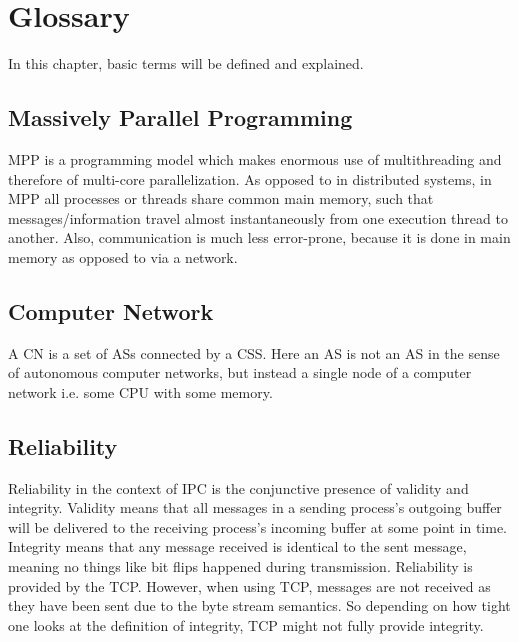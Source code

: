 \chapter{Glossary}

In this chapter, basic terms will be defined and explained.

\section{Massively Parallel Programming}

\acf{MPP} is a programming model which makes enormous use of multithreading and therefore of multi-core parallelization. As opposed to in distributed systems, in \ac{MPP} all processes or threads share common main memory, such that messages/information travel almost instantaneously from one execution thread to another. Also, communication is much less error-prone, because it is done in main memory as opposed to via a network.

\section{Computer Network}

A \ac{CN} is a set of \acp{AS} connected by a \ac{CSS}. Here an \ac{AS} is not an \ac{AS} in the sense of autonomous computer networks, but instead a single node of a computer network i.e. some CPU with some memory.

\section{Reliability}

Reliability in the context of \ac{IPC} is the conjunctive presence of validity and integrity. Validity means that all messages in a sending process's outgoing buffer will be delivered to the receiving process's incoming buffer at some point in time. Integrity means that any message received is identical to the sent message, meaning no things like bit flips happened during transmission. Reliability is provided by the \ac{TCP}. However, when using \ac{TCP}, messages are not received as they have been sent due to the byte stream semantics. So depending on how tight one looks at the definition of integrity, \ac{TCP} might not fully provide integrity.